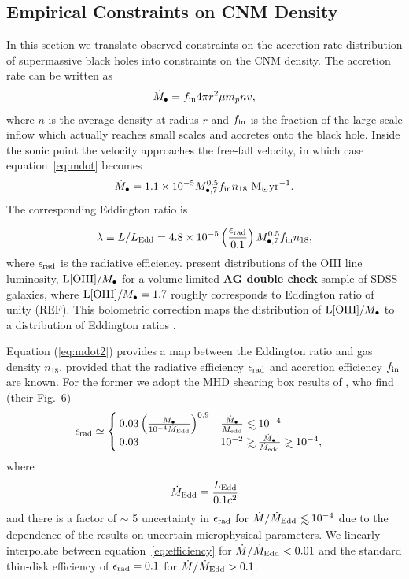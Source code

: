 \documentclass[usenatbib,fleqn]{mnras}
\newcommand\lsim{\mathrel{\rlap{\lower4pt\hbox{\hskip1pt$\sim$}}
    \raise1pt\hbox{$<$}}}
\newcommand\gsim{\mathrel{\rlap{\lower4pt\hbox{\hskip1pt$\sim$}}
    \raise1pt\hbox{$>$}}}
\newcommand       \be          {\begin{eqnarray}}
\newcommand       \ee          {\end{eqnarray}}
\newcommand{\Mbh}[1][]{M_{\bullet#1}}
\newcommand{\Msun}{{\rm M_\odot}}
\begin{document}
\subsection{Empirical Constraints on CNM Density}
\label{sec:empirical}

In this section we translate observed constraints on the accretion rate distribution of supermassive black holes into constraints on the CNM density.  The accretion rate can be written as
\begin{equation}
\dot{M}_{\bullet} = f_{\rm in} 4 \pi r^2 \mu m_p n v,
\label{eq:mdot}
\end{equation}
where $n$ is the average density at radius $r$ and $f_{\rm in}$
is the fraction of the large scale inflow which actually reaches small scales and accretes onto the black hole. 
Inside the sonic point the velocity approaches the free-fall velocity, in which case  equation~\eqref{eq:mdot} becomes
\begin{equation}
  \dot{M}_{\bullet} = 1.1\times 10^{-5} \Mbh[,7]^{0.5} f_{\rm in}
  n_{18} \,\,\Msun {\rm yr}^{-1}.
\label{eq:mdot2}
\end{equation}
%
The corresponding Eddington ratio is

\begin{equation}
  \lambda\equiv L/L_{\rm Edd} = 4.8 \times 10^{-5}
  \left(\frac{\epsilon_{\rm rad}}{0.1}\right) \Mbh[,7]^{0.5} f_{\rm in}
  n_{18},
\label{eq:n18Edd}
\end{equation}
%
where $\epsilon_{\rm rad}$ is the radiative efficiency. \citet{Kauffmann&Heckman2009} present distributions of the OIII line luminosity, ${\rm L[OIII]}/\Mbh$ for a volume limited {\bf
  AG double check} sample of SDSS galaxies, where ${\rm L[OIII]}/\Mbh=1.7$ roughly
corresponds to Eddington ratio of unity (REF).  This bolometric correction maps the distribution of ${\rm L[OIII]}/\Mbh$ to a distribution of Eddington ratios \citep{Kauffmann&Heckman2009}.

Equation (\ref{eq:mdot2}) provides a map between the Eddington ratio and gas density $n_{18}$, provided that the radiative efficiency $\epsilon_{\rm rad}$ and accretion efficiency $f_{\rm in}$  are known.  For the former we adopt the MHD shearing box results of \citet{Sharma+2007}, who find (their Fig.~6)
\begin{align}
&\epsilon_{\rm rad} \simeq 
\begin{cases}
  0.03 \left(\frac{\dot{M}_{\bullet}}{10^{-4}\dot{M}_{\rm Edd}}\right)^{0.9} & \frac{\dot{M}_{\bullet}}{\dot{M}_{\rm edd}} \lsim 10^{-4} \\
 0.03 &  10^{-2} \gsim \frac{\dot{M}_{\bullet}}{\dot{M}_{\rm edd}}
 \gsim  10^{-4},
\end{cases}
\label{eq:efficiency}
\end{align}
where
\be
\dot{M}_{\rm Edd} \equiv \frac{L_{\rm Edd}}{0.1 c^2}
\ee
and there is a factor of $\sim$ 5 uncertainty in $\epsilon_{\rm rad}$ for $\dot{M}/\dot{M}_{\rm Edd}\lsim 10^{-4}$ due to the dependence of the results on uncertain microphysical parameters.  We linearly interpolate between equation~\eqref{eq:efficiency} for $\dot{M}/\dot{M}_{\rm Edd}<0.01$ and the standard thin-disk efficiency of $\epsilon_{\rm rad}=0.1$ for $\dot{M}/\dot{M}_{\rm Edd}>0.1$. 
\end{document}
